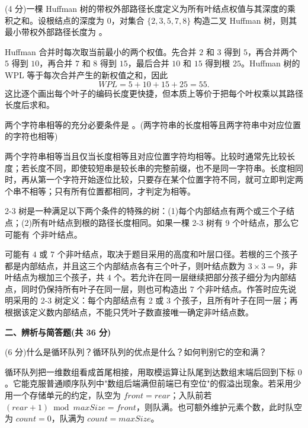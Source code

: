 \begin{question}
(4 分)一棵 Huffman 树的带权外部路径长度定义为所有叶结点权值与其深度的乘积之和。设根结点的深度为 0，对集合 $\{ 2, 3, 5, 7, 8 \}$ 构造二叉 Huffman 树，则其最小带权外部路径长度为 \blank。
\begin{solution}
Huffman 合并时每次取当前最小的两个权值。先合并 $2$ 和 $3$ 得到 $5$，再合并两个 $5$ 得到 $10$，再合并 $7$ 和 $8$ 得到 $15$，最后合并 $10$ 和 $15$ 得到根 $25$。Huffman 树的 WPL 等于每次合并产生的新权值之和，因此
\[
WPL=5+10+15+25=55.
\]
这比逐个画出每个叶子的编码长度更快捷，但本质上等价于把每个叶权乘以其路径长度后求和。
\end{solution}
\end{question}

\begin{question}
两个字符串相等的充分必要条件是 \blank。(两字符串的长度相等且两字符串中对应位置的字符也相等)
\begin{solution}
两个字符串相等当且仅当长度相等且对应位置字符均相等。比较时通常先比较长度；若长度不同，即使较短串是较长串的完整前缀，也不是同一字符串。长度相同时，再从第一个字符开始逐位比较，只要存在某个位置字符不同，就可立即判定两个串不相等；只有所有位置都相同，才判定为相等。
\end{solution}
\end{question}

\begin{question}
2-3 树是一种满足以下两个条件的特殊的树：(1)每个内部结点有两个或三个子结点；(2)所有叶结点到根的路径长度相同。如果一棵 2-3 树有 9 个叶结点，那么它可能有 \blank 个非叶结点。
\begin{solution}
可能有 $4$ 或 $7$ 个非叶结点，取决于题目采用的高度和叶层口径。若根的三个孩子都是内部结点，并且这三个内部结点各有三个叶子，则叶结点数为 $3\times3=9$，非叶结点为根加三个孩子，共 $4$ 个。若允许在同一层继续把部分孩子细分为内部结点，同时仍保持所有叶子在同一层，则也可构造出 $7$ 个非叶结点。作答时应先说明采用的 2-3 树定义：每个内部结点有 2 或 3 个孩子，且所有叶子在同一层；再根据该定义数内部结点，不能只凭叶子数直接唯一确定非叶结点数。
\end{solution}
\end{question}

\textbf{二、辨析与简答题(共 36 分)}

\begin{question}
(6 分)什么是循环队列？循环队列的优点是什么？如何判别它的空和满？
\begin{solution}
循环队列把一维数组看成首尾相接，用取模运算让队尾到达数组末端后回到下标 $0$。它能克服普通顺序队列中"数组后端满但前端已有空位"的假溢出现象。若采用少用一个存储单元的约定，队空为 $front=rear$；入队前若 $(rear+1)\bmod maxSize=front$，则队满。也可额外维护元素个数，此时队空为 $count=0$，队满为 $count=maxSize$。
\end{solution}
\end{question}

